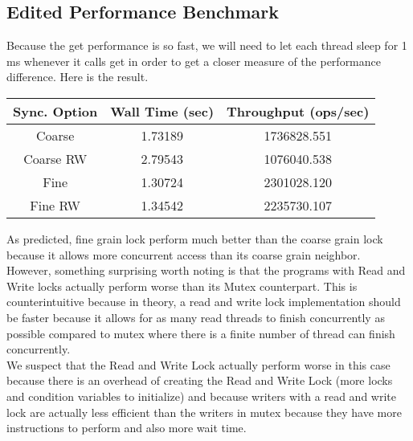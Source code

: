 \documentclass[11pt]{article}
\begin{document}
\subsection{Edited Performance Benchmark}
Because the get performance is so fast, we will need to let each thread sleep for 1 ms whenever it calls get in order to get a closer measure of the performance difference. Here is the result.
\begin{table}[H]
	\centering
	\begin{tabular}{|c|c|c|}
		\hline
		Sync. Option &Wall Time (sec)	&Throughput (ops/sec)	\\
		\hline
		Coarse &1.73189	&1736828.551\\
		\hline
		Coarse RW &2.79543 &1076040.538\\
		\hline
		Fine	&1.30724	&2301028.120\\
		\hline
		Fine RW	&1.34542	&2235730.107\\
		\hline
	\end{tabular}
\end{table}
As predicted, fine grain lock perform much better than the coarse grain lock because it allows more concurrent access than its coarse grain neighbor.\\
However, something surprising worth noting is that the programs with Read and Write locks actually perform worse than its Mutex counterpart. This is counterintuitive because in theory, a read and write lock implementation should be faster because it allows for as many read threads to finish concurrently as possible compared to mutex where there is a finite number of thread can finish concurrently.\\
We suspect that the Read and Write Lock actually perform worse in this case because there is an overhead of creating the Read and Write Lock (more locks and condition variables to initialize) and because writers with a read and write lock are actually less efficient than the writers in mutex because they have more instructions to perform and also more wait time.
\end{document}
